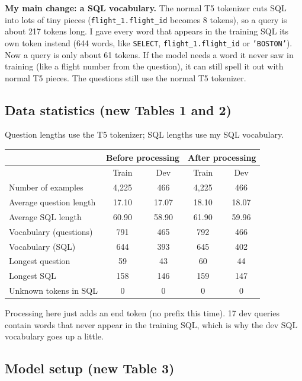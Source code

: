 \documentclass[11pt]{article}
\newcommand{\code}[1]{\texttt{#1}}
\begin{document}
\textbf{My main change: a SQL vocabulary.} The normal T5 tokenizer cuts SQL into lots of tiny
pieces (\code{flight\_1.flight\_id} becomes 8 tokens), so a query is about 217 tokens long. I gave
every word that appears in the training SQL its own token instead (644 words, like \code{SELECT},
\code{flight\_1.flight\_id} or \code{'BOSTON'}). Now a query is only about 61 tokens. If the model
needs a word it never saw in training (like a flight number from the question), it can still spell
it out with normal T5 pieces. The questions still use the normal T5 tokenizer.

\subsection*{Data statistics (new Tables 1 and 2)}

Question lengths use the T5 tokenizer; SQL lengths use my SQL vocabulary.

\begin{table}[H]
\centering
\begin{tabular}{|l|c|c|c|c|}
\hline
 & \multicolumn{2}{c|}{Before processing} & \multicolumn{2}{c|}{After processing} \\ \hline
 & Train & Dev & Train & Dev \\ \hline
Number of examples & 4,225 & 466 & 4,225 & 466 \\
Average question length & 17.10 & 17.07 & 18.10 & 18.07 \\
Average SQL length & 60.90 & 58.90 & 61.90 & 59.96 \\
Vocabulary (questions) & 791 & 465 & 792 & 466 \\
Vocabulary (SQL) & 644 & 393 & 645 & 402 \\
Longest question & 59 & 43 & 60 & 44 \\
Longest SQL & 158 & 146 & 159 & 147 \\
Unknown tokens in SQL & 0 & 0 & 0 & 0 \\ \hline
\end{tabular}
\end{table}

Processing here just adds an end token (no prefix this time). 17 dev queries contain words that
never appear in the training SQL, which is why the dev SQL vocabulary goes up a little.

\subsection*{Model setup (new Table 3)}
\end{document}
